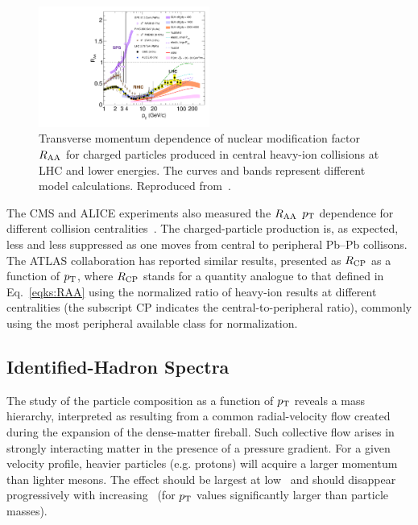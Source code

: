\begin{figure}[!ht]
\centering
\includegraphics[width=0.5\textwidth]{particlefigs/CMSRAA.pdf}
\caption{Transverse momentum dependence of nuclear modification factor $R_{\rm AA}$ for charged particles produced in central heavy-ion collisions at LHC and lower energies. The curves and bands represent different model calculations. Reproduced from~\cite{CMS:2012aa}.}
\label{figks:CMSRAA}
\end{figure}

The CMS and ALICE experiments also measured the $R_{\rm AA}$ $p_{\rm T}$ dependence for different collision centralities~\cite{CMS:2012aa,Abelev:2012hxa}. The charged-particle production is, as expected, less and less suppressed as one moves from central to peripheral Pb--Pb collisons. The ATLAS collaboration has reported similar results, presented as $R_{\rm CP}$ as a function of $p_{\rm T}$, where $R_{\rm CP}$ stands for a quantity analogue  to that defined in Eq.~\ref{eqks:RAA} using the normalized ratio of heavy-ion results at different centralities (the subscript CP indicates the central-to-peripheral ratio), commonly using the most peripheral available class for normalization.
\subsection{Identified-Hadron Spectra}
\label{subsecks:identspectra}
The study of the particle composition as a function of $p_{\rm T}$ reveals a mass hierarchy, interpreted as resulting from a common radial-velocity flow created during the expansion of the dense-matter fireball. Such collective flow arises in strongly interacting matter in the presence of a pressure gradient. For a given velocity profile, heavier particles (e.g. protons) will acquire a larger momentum than lighter mesons. The effect should be largest at low \pt\ and should disappear progressively with increasing \pt\ (for $p_{\rm T}$ values significantly larger than particle masses).


